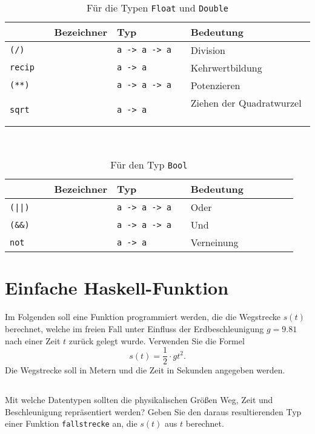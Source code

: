 \documentclass[
  10pt,                   %
  DIV12,
  german,                 %
  oneside,                %
  parskip=half,           %
  headings=normal,        %
  captions=tableheading,  %
]{scrartcl}
\begin{document}
\begin{table}[H]
	\centering
    \begin{tabular}{lll} %
        Bezeichner & Typ         & Bedeutung         \\ \hline
		\lstinline|(/)|	 	& \lstinline|a -> a -> a| & Division\\
		\lstinline|recip| 	& \lstinline|a -> a| & Kehrwertbildung\\
		\lstinline|(**)| 	& \lstinline|a -> a -> a| & Potenzieren\\
		\lstinline|sqrt| 	& \lstinline|a -> a| & Ziehen der Quadratwurzel %
    \end{tabular}
\caption{Für die Typen \lstinline|Float| und \lstinline|Double|}
\end{table}
\begin{table}[H]
	\centering
    \begin{tabular}{lll} %
        Bezeichner & Typ         & Bedeutung         \\ \hline
		\lstinline!(||)!	& \lstinline|a -> a -> a| & Oder\\
		\lstinline|(&&)| 	& \lstinline|a -> a -> a| & Und\\
		\lstinline|not| 	& \lstinline|a -> a| & Verneinung %
    \end{tabular}
\caption{Für den Typ \lstinline|Bool|}
\end{table}
\newpage
\renewcommand*\thesubsection{\alph{subsection})}
\section{Einfache Haskell-Funktion}
Im Folgenden soll eine Funktion programmiert werden, die die
Wegstrecke $s(t)$ berechnet, welche im freien Fall unter Einfluss der Erdbeschleunigung $g = 9.81$ nach einer Zeit $t$ zurück gelegt wurde. Verwenden Sie die Formel 
\begin{displaymath}
s(t) = \frac{1}{2} \cdot gt^2.
\end{displaymath}
Die Wegstrecke soll in Metern und die Zeit in Sekunden angegeben werden.
\subsection{}
Mit welche Datentypen sollten die physikalischen Größen Weg, Zeit und Beschleunigung repräsentiert werden? Geben Sie den daraus resultierenden Typ einer Funktion \lstinline|fallstrecke| an, die $s(t)$ aus $t$ berechnet.
\end{document}
